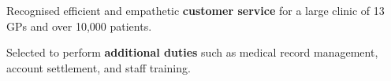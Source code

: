 \begin{zitemize}
\item Recognised efficient and empathetic \textbf{customer service} for a large clinic of 13 GPs and over 10,000 patients. 
\item Selected to perform \textbf{additional duties} such as medical record management, account settlement, and staff training.
\end{zitemize}
\vspace{0.5em}
